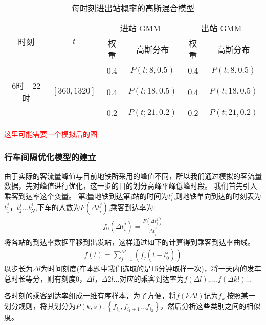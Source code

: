 \documentclass[12pt,a4paper]{mcmthesis}
\begin{document}
\begin{table}[h]
	\centering
	\caption{每时刻进出站概率的高斯混合模型}
	\label{tab:p1_gmm-time}
	\begin{tabular}{c|c|cc|cc}
		\hline
		\multirow{2}{*}{时刻} & \multirow{2}{*}{$t$} & \multicolumn{2}{c|}{进站 GMM} & \multicolumn{2}{c}{出站 GMM} \\ \cline{3-6}
		&                        & 权重 & 高斯分布      & 权重 & 高斯分布      \\ \hline
		&                        & 0.4 & $P(t;8,0.5)$ & 0.4 & $P(t;8,0.5)$ \\
		6时 - 22时 & $\left[360,1320\right]$ & 0.4 & $P(t;18,0.5)$ & 0.4 & $P(t;18,0.5)$ \\
		&                        & 0.2 & $P(t;21,0.2)$ & 0.2 & $P(t;21,0.2)$ \\ \hline
	\end{tabular}
\end{table}
\textcolor{red}{这里可能需要一个模拟后的图}

\subsubsection{行车间隔优化模型的建立}
由于实际的客流量峰值与目前地铁所采用的峰值不同，所以我们通过模拟的客流量数据，先对峰值进行优化，这一步的目的划分高峰平峰低峰时段。
我们首先引入乘客到达率这个变量。
第i量地铁到达第j站的时间为$t_i^j$,则地铁单向到达的时刻表为$t_1^j，t_2^j...t_N^j$,下车的人数为$F(\Delta t_i^j)$,乘客到达率为:
\begin{equation}
	\begin{aligned}
		f_0(\Delta t_i^j)=\frac{F(\Delta t_i^j)}{\Delta t_i^j}
	\end{aligned}
\end{equation}
将各站的到达率数据平移到出发站，这样通过如下的计算得到乘客到达率曲线。
\begin{equation}
	\begin{aligned}
		f(t)=\sum_{j=1}^{M}(f_j(t-t_0^j))
	\end{aligned}
\end{equation}
以步长为$\Delta l$为时间刻度(在本题中我们选取的是15分钟取样一次)，将一天内的发车总时长等分，则有刻度0，$\Delta l$，$\Delta 2l$...对应的乘客到达率为$f(\Delta l)$,...,$f(\Delta kl)$...

各时刻的乘客到达率组成一维有序样本，为了方便，将$f(k\Delta l)$记为$f_k$.按照某一划分规则，将其划分为$P(k,s):\left \{ {f_{i_1},f_{i_1+1}...f_{i_2}} \right \}$，然后分析这些类别之间的相似度。
\end{document}
